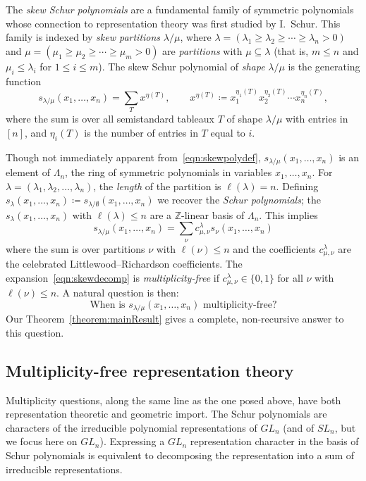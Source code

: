 \documentclass[10pt]{article}
\theoremstyle{definition}
\begin{document}
The \emph{skew Schur polynomials} are a fundamental family of symmetric polynomials whose connection to representation theory was first studied by I.~Schur. This family is indexed by \emph{skew partitions} $\lambda / \mu$, where $\lambda = (\lambda_1 \geq \lambda_2 \geq \cdots \geq \lambda_n > 0)$ and $\mu = (\mu_1 \geq \mu_2 \geq \cdots \geq \mu_m > 0)$ are \emph{partitions} with $\mu \subseteq \lambda$ (that is, $m \leq n$ and $\mu_i \leq \lambda_i$ for $1\leq i \leq m$). The skew Schur polynomial of \emph{shape} $\lambda / \mu$ is the generating function
\begin{equation}
\label{eqn:skewpolydef}
s_{\lambda / \mu}(x_1,\ldots,x_n) = \sum_T x^{\eta(T)}, \qquad x^{\eta(T)}\coloneqq x_1^{\eta_1(T)}x_2^{\eta_2(T)}\cdots x_n^{\eta_n(T)},
\end{equation}
where the sum is over all semistandard tableaux $T$ of shape $\lambda / \mu$ with entries in $[n]$, and $\eta_i(T)$ is the number of entries in $T$ equal to $i$.

Though not immediately apparent from~\eqref{eqn:skewpolydef}, $s_{\lambda / \mu}(x_1,\ldots,x_n)$ is an element of $\Lambda_n$, the ring of symmetric polynomials in variables $x_1,\ldots,x_n$. For $\lambda = (\lambda_1, \lambda_2, \hdots ,\lambda_n )$, the \emph{length} of the partition is $\ell(\lambda) = n$. Defining $s_{\lambda}(x_1,\ldots,x_n) \coloneqq s_{\lambda / \emptyset}(x_1,\ldots,x_n)$ we recover the \emph{Schur polynomials}; the $s_{\lambda}(x_1,\ldots,x_n)$ with $\ell(\lambda) \leq n$ are a $\mathbb{Z}$-linear basis of $\Lambda_n$. This implies
\begin{equation}
\label{eqn:skewdecomp}
s_{\lambda / \mu}(x_1,\ldots,x_n) = \sum_\nu c_{\mu,\nu}^{\lambda} s_{\nu}(x_1,\ldots,x_n)
\end{equation}
where the sum is over partitions $\nu$ with $\ell(\nu) \leq n$ and the coefficients $c_{\mu,\nu}^{\lambda}$ are the celebrated Littlewood--Richardson coefficients. The expansion~\eqref{eqn:skewdecomp} is \emph{multiplicity-free} if $c_{\mu,\nu}^{\lambda} \in \{0,1\}$ for all $\nu$ with $\ell(\nu) \leq n$. A natural question is then: 
\[
\text{When is $s_{\lambda / \mu}(x_1,\ldots,x_n)$ multiplicity-free?}
\] 
Our Theorem~\ref{theorem:mainResult} gives a complete, non-recursive answer to this question.

\subsection{Multiplicity-free representation theory} Multiplicity questions, along the same line as the one posed above, have both representation theoretic and geometric import. The Schur polynomials are characters of the irreducible polynomial representations of $GL_n$ (and of $SL_n$, but we focus here on $GL_n$). Expressing a $GL_n$ representation character in the basis of Schur polynomials is equivalent to decomposing the representation into a sum of irreducible representations. 
\end{document}
